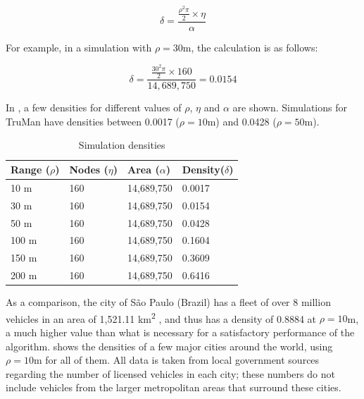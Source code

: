 $$ \delta = \frac{\frac{\rho^2\pi}{2} \times \eta}{\alpha} $$

For example, in a simulation with $\rho = 30$m, the calculation is as follows:

$$ \delta = \frac{\frac{30^2\pi}{2} \times 160}{14,689,750} = 0.0154$$

In , a few densities for different values of $\rho$, $\eta$ and $\alpha$ are shown. 
Simulations for TruMan have densities between 0.0017 ($\rho = 10$m) and 0.0428 ($\rho = 50$m).

\begin{table}[h!]
\caption{Simulation densities}
\label{table:simdensities}
\centering
\begin{tabular}{|p{2cm}|p{2cm}|p{2cm}|p{2cm}|}
 \hline
 \textbf{Range ($\rho$)} & \textbf{Nodes ($\eta$)} & \textbf{Area ($\alpha$)} & \textbf{Density($\delta$)} \\
 \hline
 \hline
 10 m & 160 & 14,689,750 & 0.0017 \\
 \hline
 30 m & 160 & 14,689,750 & 0.0154 \\
 \hline
 50 m & 160 & 14,689,750 & 0.0428 \\
 \hline
 100 m & 160 & 14,689,750 & 0.1604 \\
 \hline
 150 m & 160 & 14,689,750 & 0.3609 \\
 \hline
 200 m & 160 & 14,689,750 & 0.6416 \\
 \hline
\end{tabular}
\end{table}

As a comparison, the city of São Paulo (Brazil) has a fleet of over 8 million vehicles \citep{saopaulofleet} in an area of 1,521.11 km\textsuperscript{2} \citep{saopauloarea}, and thus has a density of 0.8884 at $\rho = 10$m, a much higher value than what is necessary for a satisfactory performance of the algorithm.
 shows the densities of a few major cities around the world, using $\rho = 10$m for all of them.
All data is taken from local government sources regarding the number of licensed vehicles in each city; these numbers do not include vehicles from the larger metropolitan areas that surround these cities.


